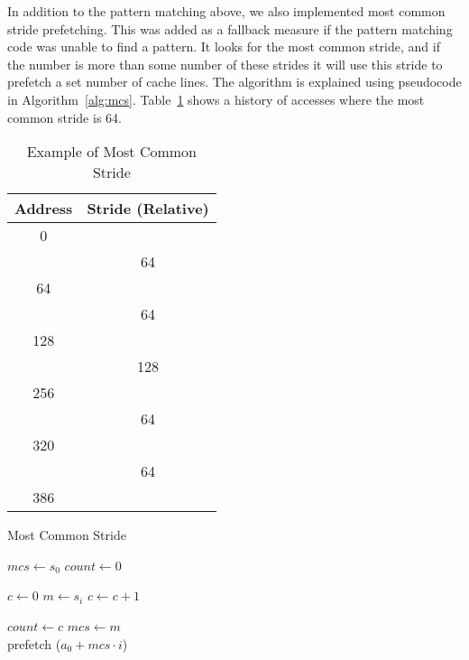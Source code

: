 In addition to the pattern matching above, we also implemented most common stride
prefetching. This was added as a fallback measure if the pattern matching code
was unable to find a pattern.
It looks for the most common stride, and if the number
is more than some number
of these strides it will use this stride to prefetch a
set number of cache lines.
The algorithm is explained using pseudocode in Algorithm~\ref{alg:mcs}.
Table~\ref{table:mcs} shows a history of accesses
where the most common stride is 64.
\begin{table}
	\caption{Example of Most Common Stride}
	\centering
	\label{table:mcs}
	\begin{tabular}{c|c}
		\bfseries Address & \bfseries Stride (Relative)\\
		\hline
		0   & \\
		    & 64\\
		64  & \\
		    & 64\\
		128 & \\
		    & 128\\
		256 & \\
		    & 64\\
		320 & \\
		    & 64\\
		386 & \\
	\end{tabular}
\end{table}

\begin{algorithm}
	\caption{Most Common Stride}
	\label{alg:mcs}
	\begin{algorithmic}
		\State $mcs \gets s_0$
		\State $count \gets 0$

			\State $c \gets 0$
			\State $m \gets s_i$
				 \State $c \gets c + 1$ \EndIf
			\EndFor

				\State $count \gets c$
				\State $mcs \gets m$
			\EndIf
		\EndFor
		\\
				\State prefetch ($a_0 + mcs \cdot i$)
			\EndFor
		\EndIf
	\end{algorithmic}
\end{algorithm}
